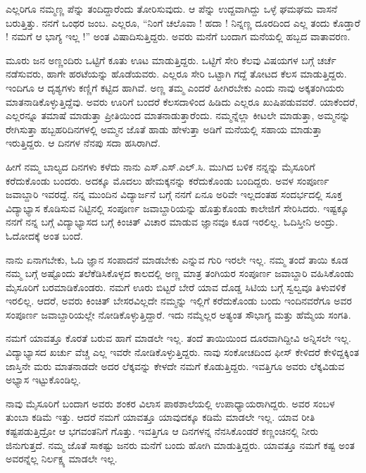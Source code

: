 {ಎಲ್ಲರಿಗೂ ನಮ್ಮಣ್ಣ ಪೆನ್ನು ತಂದಿದ್ದಾರೆಂದು ತೋರಿಸುವುದು. ಆ ಪೆನ್ನು ಉದ್ದ\-ವಾಗಿದ್ದು ಒಳ್ಳೆ ಘಮಘಮ ವಾಸನೆ ಬರುತ್ತಿತ್ತು.  ನನಗೆ ಒಂಥರ ಜಂಬ. ಎಲ್ಲರೂ, “ನಿಂಗೆ ಚಲೊವಾ ! ಹದಾ ! ನಿನ್ನಣ್ಣ ದೂರದಿಂದ ಎಲ್ಲ ತಂದು ಕೊಡ್ತಾರೆ ! ನಮಗೆ ಆ ಭಾಗ್ಯ ಇಲ್ಲ !” ಅಂತ ವಿಷಾದಿಸುತ್ತಿದ್ದರು.  ಅವರು ಮನೆಗೆ ಬಂದಾಗ  ಮನೆಯಲ್ಲಿ ಹಬ್ಬದ ವಾತಾವರಣ.  

ಮೂರು ಜನ ಅಣ್ಣಂದಿರು ಒಟ್ಟಿಗೆ ಕೂತು ಊಟ ಮಾಡುತ್ತಿದ್ದರು. ಒಟ್ಟಿಗೆ ಸೇರಿ ಕೆಲವು ವಿಷಯಗಳ ಬಗ್ಗೆ ಚರ್ಚೆ ನಡೆಸುವರು, ಹಾಗೇ ಹರಟೆಯನ್ನು ಹೊಡೆಯವರು.  ಎಲ್ಲರೂ ಸೇರಿ ಒಟ್ಟಾಗಿ ಗದ್ದೆ ತೋಟದ ಕೆಲಸ ಮಾಡುತ್ತಿದ್ದರು. ಇಂದಿಗೂ ಆ ದೃಶ್ಯಗಳು ಕಣ್ಣಿಗೆ ಕಟ್ಟಿದ ಹಾಗಿವೆ.  ಅಣ್ಣ ತಮ್ಮ ಎಂದರೆ ಹೀಗಿರಬೇಕು ಎಂದು ನಾವು ಅಕ್ಕತಂಗಿಯರು ಮಾತನಾಡಿಕೊಳ್ಳುತ್ತಿದ್ದೆವು. ಅವರು ಊರಿಗೆ ಬಂದರೆ ಕೆಲಸದಾಳಿಂದ ಹಿಡಿದು ಎಲ್ಲರೂ ಖುಷಿಪಡುವವರೆ. ಯಾಕೆಂದರೆ, ಎಲ್ಲರನ್ನೂ ತಮಾಷೆ ಮಾಡುತ್ತಾ ಪ್ರೀತಿಯಿಂದ ಮಾತನಾಡುತ್ತಾರೆಂದು.  ನಮ್ಮನ್ನೆಲ್ಲಾ ಕೀಟಲೇ ಮಾಡುತ್ತಾ, ಅಮ್ಮನನ್ನು ರೇಗಿಸುತ್ತಾ ಹಬ್ಬಹರಿದಿನಗಳಲ್ಲಿ ಅಮ್ಮನ ಜೊತೆ ಹಾಡು ಹೇಳುತ್ತಾ ಅಡಿಗೆ ಮನೆಯಲ್ಲಿ ಸಹಾಯ ಮಾಡುತ್ತಾ ಇರುತ್ತಿದ್ದರು.  ಆ ದಿನಗಳ ನೆನಪು ಸದಾ ಹಸಿರಾಗಿದೆ.

ಹೀಗೆ ನಮ್ಮ ಬಾಲ್ಯದ ದಿನಗಳು ಕಳೆದು ನಾನು ಎಸ್.ಎಸ್.ಎಲ್.ಸಿ. ಮುಗಿದ ಬಳಿಕ ನನ್ನನ್ನು ಮೈಸೂರಿಗೆ ಕರೆದುಕೊಂಡು ಬಂದರು. ಅದಕ್ಕೂ ಮೊದಲು ಹೇಮಕ್ಕನನ್ನು ಕರೆದು\-ಕೊಂಡು ಬಂದಿದ್ದರು. ಅವಳ ಸಂಪೂರ್ಣ ಜವಾಬ್ದಾರಿ ಇವರದ್ದೆ.  ನನ್ನ ಮುಂದಿನ ವಿದ್ಯಾರ್ಜನೆ ಬಗ್ಗೆ ನನಗೆ ಏನೂ ಅರಿವೇ ಇಲ್ಲದಂತಹ ಸಂದರ್ಭದಲ್ಲಿ ಸೂಕ್ತ ವಿದ್ಯಾಭ್ಯಾಸ ಕೊಡಿಸುವ ನಿಟ್ಟಿನಲ್ಲಿ  ಸಂಪೂರ್ಣ  ಜವಾಬ್ದಾರಿಯನ್ನು ಹೊತ್ತುಕೊಂಡು ಕಾಲೇಜಿಗೆ ಸೇರಿಸಿದರು. ಇಷ್ಟಕ್ಕೂ ನನಗೆ ನನ್ನ ಬಗ್ಗೆ ವಿದ್ಯಾಭ್ಯಾಸದ ಬಗ್ಗೆ ಕಿಂಚಿತ್ ವಿಚಾರ ಮಾಡುವ ಜ್ಞಾನವೂ ಕೂಡ ಇರಲಿಲ್ಲ. ಓದಿಸ್ತೀನಿ ಅಂದ್ರು. ಓದೋದಕ್ಕೆ ಅಂತ ಬಂದೆ. 

ನಾನು ಏನಾಗಬೇಕು, ಓದಿ ಜ್ಞಾನ ಸಂಪಾದನೆ ಮಾಡಬೇಕು ಎನ್ನುವ ಗುರಿ ಇರಲೇ ಇಲ್ಲ. ನಮ್ಮ ತಂದೆ ತಾಯಿ ಕೂಡ ನಮ್ಮ ಬಗ್ಗೆ ಅಷ್ಟೊಂದು ತಲೆಕೆಡಿಸಿಕೊಳ್ಳದ ಕಾಲದಲ್ಲಿ ಅಣ್ಣ ಮಾತ್ರ ತಂಗಿಯರ ಸಂಪೂರ್ಣ ಜವಾಬ್ದಾರಿ ವಹಿಸಿಕೊಂಡು ಮೈಸೂರಿಗೆ ಬರ\-ಮಾಡಿಕೊಂಡರು.  ನಮಗೆ ಊರು ಬಿಟ್ಟರೆ ಬೇರೆ ಯಾವ ದೊಡ್ಡ ಸಿಟಿಯ ಬಗ್ಗೆ ಸ್ವಲ್ವವೂ ತಿಳುವಳಿಕೆ ಇರಲಿಲ್ಲ. ಆದರೆ, ಅವರು ಕಿಂಚಿತ್ ಬೇಸರವಿಲ್ಲದೇ ನಮ್ಮನ್ನು ಇಲ್ಲಿಗೆ ಕರೆದು\-ಕೊಂಡು ಬಂದು ಇಂದಿನವರೆಗೂ ಅವರ ಸಂಪೂರ್ಣ ಜವಾಬ್ದಾರಿಯಲ್ಲೇ ನೋಡಿ\-ಕೊಳ್ಳುತ್ತಿದ್ದಾರೆ.  ಇದು ನಮ್ಮೆಲ್ಲರ ಅತ್ಯಂತ ಸೌಭಾಗ್ಯ ಮತ್ತು ಹೆಮ್ಮೆಯ ಸಂಗತಿ. 

ನಮಗೆ ಯಾವತ್ತೂ ಕೊರತೆ ಬರುವ ಹಾಗೆ ಮಾಡಲೇ ಇಲ್ಲ. ತಂದೆ   \enginline{-}   ತಾಯಿಯಿಂದ ದೂರವಾಗಿದ್ದೀವಿ ಅನ್ನಿಸಲೇ ಇಲ್ಲ. ವಿದ್ಯಾಭ್ಯಾಸದ ಖರ್ಚು ವೆಚ್ಚ ಎಲ್ಲ ಇವರೇ ನೋಡಿಕೊಳ್ಳುತ್ತಿದ್ದರು.  ನಾವು ಸಂಕೋಚದಿಂದ ಫೀಸ್ ಕೇಳಿದರೆ ಕೇಳಿದ್ದಕ್ಕಿಂತ ಜಾಸ್ತಿನೇ ಮರು ಮಾತನಾಡದೇ ಅದರ ಲೆಕ್ಕವನ್ನು ಕೇಳದೇ ನಮಗೆ ಕೊಡುತ್ತಿದ್ದರು.  ಇವತ್ತಿಗೂ ಅವರು ಲೆಕ್ಕವಿಡುವ ಅಭ್ಯಾಸ ಇಟ್ಟುಕೊಂಡಿಲ್ಲ.

ನಾವು ಮೈಸೂರಿಗೆ ಬಂದಾಗ ಅವರು ಶಂಕರ ವಿಲಾಸ  ಪಾಠಶಾಲೆಯಲ್ಲಿ ಉಪಾ\-ಧ್ಯಾಯ\-ರಾಗಿದ್ದರು.  ಅವರ ಸಂಬಳ ತುಂಬಾ ಕಡಿಮೆ ಇತ್ತು. ಆದರೆ ನಮಗೆ ಯಾವತ್ತೂ ಯಾವುದಕ್ಕೂ ಕಡಿಮೆ ಮಾಡಲೇ ಇಲ್ಲ.  ಯಾವ ರೀತಿ ಕಷ್ಟಪಡುತ್ತಿದ್ರೋ ಆ ಭಗವಂತನಿಗೆ ಗೊತ್ತು.  ಇವತ್ತಿಗೂ ಆ ದಿನಗಳನ್ನ ನೆನಸಿಕೊಂಡರೆ ಕಣ್ಣಂಚಿನಲ್ಲಿ ನೀರು ಜಿನುಗುತ್ತದೆ. ನಮ್ಮ ಜೊತೆ ಸಾಕಷ್ಟು ಜನರು ಮನೆಗೆ ಬಂದು   \enginline{-}   ಹೋಗಿ ಮಾಡುತ್ತಿದ್ದರು. ಯಾವತ್ತೂ ನಮಗೆ ಕಷ್ಟ ಅಂತ ಅವರನ್ನೆಲ್ಲ ನಿರ್ಲಕ್ಷ್ಯ ಮಾಡಲೇ ಇಲ್ಲ.

}
